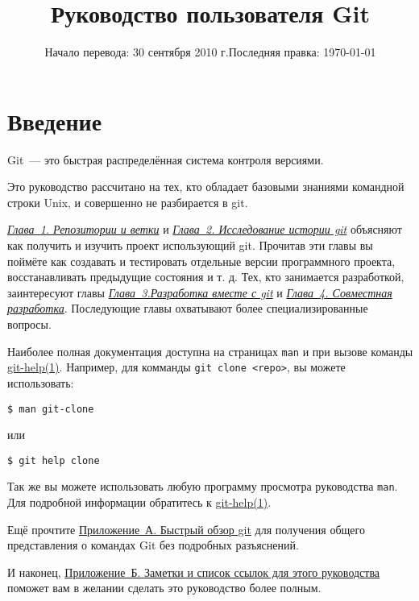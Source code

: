 \documentclass[12pt]{book}
\title{Руководство пользователя Git}
\date{Начало перевода: 30 сентября 2010 г.\linebreak Последняя правка: \today}
\begin{document}
\maketitle
\tableofcontents
\frenchspacing
%
%
\frontmatter
\hypertarget{preface}{}\chapter{Введение}
Git~--- это быстрая распределённая система контроля версиями.

Это руководство рассчитано на тех, кто обладает базовыми знаниями командной
строки Unix, и совершенно не разбирается в git.

\href{#chapter1}{\emph{Глава~1. Репозитории и ветки}} и 
\href{#chapter2}{\emph{Глава~2. Исследование истории git}} объясняют как 
получить и изучить проект использующий git. Прочитав эти главы вы поймёте как 
создавать и тестировать отдельные версии программного проекта, восстанавливать 
предыдущие состояния и т. д. Тех, кто занимается разработкой, заинтересуют главы
\href{#chapter3}{\emph{Глава~3.\linebreak Разработка вместе с git}} и 
\href{#chapter4}{\emph{Глава~4. Совместная разработка}}. После\-дующие главы 
охватывают более специализированные вопросы.

Наиболее полная документация доступна на страницах \verb|man| и при вызове
команды \href{http://www.kernel.org/pub/software/scm/git/docs/git-help.html}
{git-help(1)}. Например, для комманды \linebreak \verb|git clone <repo>|, вы 
можете использовать:

\begin{verbatim}
$ man git-clone
\end{verbatim}

или

\begin{verbatim}
$ git help clone
\end{verbatim}

Так же вы можете использовать любую программу просмотра \linebreak руководства
\verb|man|.
Для подробной информации обратитесь к 
\href{http://www.kernel.org/pub/software/scm/git/docs/git-help.html}
{git-help(1)}.

Ещё прочтите \href{#appendixa}{Приложение~А. Быстрый обзор git} для получения
\linebreak общего представления о командах Git без подробных разъяснений.

И наконец, \href{#appendixb}{Приложение~Б. Заметки и список ссылок для этого
\linebreak руководства} поможет вам в желании сделать это руководство более
\linebreak полным.
%
%
\end{document}

